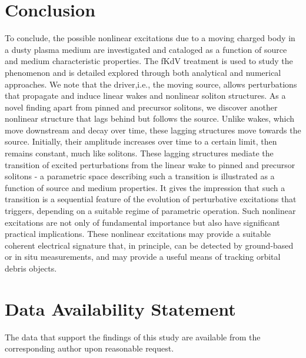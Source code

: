 \documentclass[%
 aip,
 amsmath,amssymb,
 reprint,%
]{revtex4-1}
\begin{document}
\section{\label{sec:conclusion}Conclusion}
To conclude, the possible nonlinear excitations due to a moving charged body in a dusty plasma medium are investigated and cataloged as a function of source and medium characteristic properties. The fKdV treatment is used to study the phenomenon and is detailed explored through both analytical and numerical approaches. We note that the driver,i.e., the moving source, allows perturbations that propagate and induce linear wakes and nonlinear soliton structures. As a novel finding apart from pinned and precursor solitons, we discover another nonlinear structure that lags behind but follows the source. Unlike wakes, which move downstream and decay over time, these lagging structures move towards the source. Initially, their amplitude increases over time to a certain limit, then remains constant, much like solitons. These lagging structures mediate the transition of excited perturbations from the linear wake to pinned and precursor solitons - a parametric space describing such a transition is illustrated as a function of source and medium properties. It gives the impression that such a transition is a sequential feature of the evolution of perturbative excitations that triggers, depending on a suitable regime of parametric operation. Such nonlinear excitations are not only of fundamental importance but also have significant practical implications. These nonlinear excitations may provide a suitable coherent electrical signature that, in principle, can be detected by ground-based or in situ measurements, and may provide a useful means of tracking orbital debris objects. 

\begin{acknowledgments}

\end{acknowledgments}

 \section*{Data Availability Statement}
The data that support the findings of this study are available from the corresponding author upon reasonable request.

\nocite{*}
\end{document}
